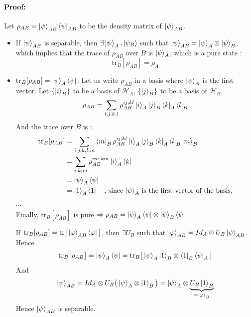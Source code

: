\documentclass{article}
\begin{document}
\paragraph{Proof: }
Let $\rho_{AB} = \ket{\psi}_{AB}\bra{\psi}_{AB}$ to be the density matrix of
$\ket{\psi}_{AB}$.
\begin{itemize}[label=( $\Rightarrow$ )]
    \item If $\ket{\psi}_{AB}$ is separable, then $\exists \ket{\psi}_A,
    \ket{\psi_B}$ such that $\ket{\psi}_{AB} = \ket{\psi}_A\otimes
    \ket{\psi}_B$, which implies that the trace of $\rho_{AB}$ over $B$ is
    $\ket{\psi}_A$, which is a pure state :
    \begin{equation}
        \text{tr}_B[\rho_{AB}] = \rho_A
    \end{equation}
\end{itemize}
\begin{itemize}[label=( $\Leftarrow$ )]
    \item tr$_B[\rho_{AB}] = \ket{\psi}_A\bra{\psi}$. Let us write $\rho_{AB}$
    in a basis where $\ket{\psi}_A$ is the first vector. Let $\{\ket{i}_B\}$ to
    be a basis of $\mathscr{H}_A$, $\{\ket{j}_B\}$ to be a basis of
    $\mathscr{H}_B$.
    \begin{equation}
        \rho_{AB} = \sum_{i,j,k,l} \rho_{AB}^{ij,kl}\ket{i}_A\ket{j}_B\bra{k}_A\bra{l}_B
    \end{equation}
    And the trace over $B$ is :
    \begin{equation}
        \begin{aligned}
            \text{tr}_B[\rho_{AB}]
                & = \sum_{i,j,k,l,m} \bra{m}_B\rho_{AB}^{ij,kl}\ket{i}_A\ket{j}_B\bra{k}_A\bra{l}_B\ket{m}_B \\
                & = \sum_{i,k,m} \rho_{AB}^{im,km} \ket{i}_A\bra{k} \\
                & = \ket{\psi}_A\bra{\psi} \\
                & = \ket{1}_A\bra{1} \quad \text{, since $\ket{\psi}_A$ is the first vector of the basis.}
        \end{aligned}
    \end{equation}
    $\cdots$ \\
    Finally, tr$_B[\rho_{AB}]$ is pure $\Rightarrow \rho_{AB} =
    \ket{\psi}_A\bra{\psi} \otimes \ket{\psi}_B\bra{\psi}$

    If $\text{tr}_B[\rho_{AB}] =
    \text{tr}\big[\ket{\varphi}_{AB}\bra{\varphi}\big]$, then $\exists U_B$ such
    that $\ket{\varphi}_{AB} = Id_A \otimes U_B\ket{\psi}_{AB}$. Hence
    \begin{equation}
        \text{tr}_B\big[\rho_{AB}\big] = \ket{\psi}_A\bra{\psi} =
        \text{tr}_B\big[\ket{\psi}_A\ket{1}_B \otimes \bra{1}_B\bra{\psi}_A\big]
    \end{equation}
    And
    \begin{equation}
        \ket{\psi}_{AB} = Id_A \otimes U_B \big(\ket{\psi}_A \otimes \ket{1}_B\big)
        = \ket{\psi}_A \otimes \underbrace{U_B\ket{1}_B}_{=\ket{\varphi}_B}
    \end{equation}
    Hence $\ket{\psi}_{AB}$ is separable.
\end{itemize}
\end{document}
